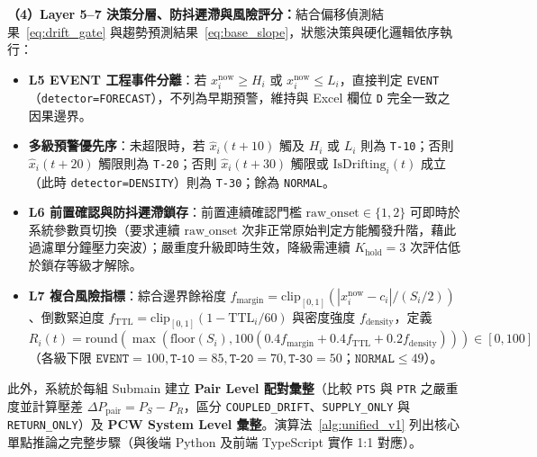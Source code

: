 \documentclass[fontset=none, a4paper, 12pt]{ctexart}
\begin{document}
\begin{doublespace}
\textbf{（4）Layer 5–7 決策分層、防抖遲滯與風險評分：}結合偏移偵測結果~\eqref{eq:drift_gate} 與趨勢預測結果~\eqref{eq:base_slope}，狀態決策與硬化邏輯依序執行：
\begin{itemize}
    \item \textbf{L5 EVENT 工程事件分離}：若 $x_i^{\mathrm{now}} \ge H_i$ 或 $x_i^{\mathrm{now}} \le L_i$，直接判定 \texttt{EVENT}（\texttt{detector=FORECAST}），不列為早期預警，維持與 Excel 欄位 \texttt{D} 完全一致之因果邊界。
    \item \textbf{多級預警優先序}：未超限時，若 $\hat{x}_i(t+10)$ 觸及 $H_i$ 或 $L_i$ 則為 \texttt{T-10}；否則 $\hat{x}_i(t+20)$ 觸限則為 \texttt{T-20}；否則 $\hat{x}_i(t+30)$ 觸限或 $\mathrm{IsDrifting}_i(t)$ 成立（此時 \texttt{detector=DENSITY}）則為 \texttt{T-30}；餘為 \texttt{NORMAL}。
    \item \textbf{L6 前置確認與防抖遲滯鎖存}：前置連續確認門檻 $\text{raw\_onset} \in \{1, 2\}$ 可即時於系統參數頁切換（要求連續 $\text{raw\_onset}$ 次非正常原始判定方能觸發升階，藉此過濾單分鐘壓力突波）；嚴重度升級即時生效，降級需連續 $K_{\mathrm{hold}}=3$ 次評估低於鎖存等級才解除。
    \item \textbf{L7 複合風險指標}：綜合邊界餘裕度 $f_{\mathrm{margin}} = \mathrm{clip}_{[0,1]}(|x_i^{\mathrm{now}}-c_i|/(S_i/2))$、倒數緊迫度 $f_{\mathrm{TTL}} = \mathrm{clip}_{[0,1]}(1 - \mathrm{TTL}_i/60)$ 與密度強度 $f_{\mathrm{density}}$，定義 $R_i(t) = \mathrm{round}(\max(\mathrm{floor}(S_i), 100(0.4 f_{\mathrm{margin}} + 0.4 f_{\mathrm{TTL}} + 0.2 f_{\mathrm{density}}))) \in [0, 100]$（各級下限 $\texttt{EVENT}=100, \texttt{T-10}=85, \texttt{T-20}=70, \texttt{T-30}=50$；$\texttt{NORMAL}\le 49$）。
\end{itemize}
此外，系統於每組 Submain 建立 \textbf{Pair Level 配對彙整}（比較 \texttt{PTS} 與 \texttt{PTR} 之嚴重度並計算壓差 $\Delta P_{\mathrm{pair}} = P_S - P_R$，區分 \texttt{COUPLED\_DRIFT}、\texttt{SUPPLY\_ONLY} 與 \texttt{RETURN\_ONLY}）及 \textbf{PCW System Level 彙整}。演算法~\ref{alg:unified_v1} 列出核心單點推論之完整步驟（與後端 Python 及前端 TypeScript 實作 1:1 對應）。


\end{doublespace}
\end{document}
